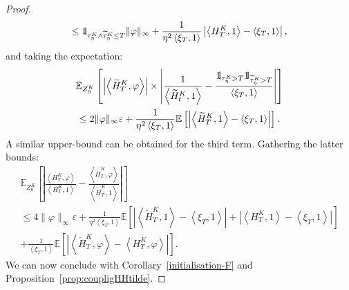 \documentclass[AHL,Unicode,longabstracts,published]{cedram}
\newcommand*\E{\mathbb{E}}
\newcommand*\ind{{\mathchoice {\rm 1\mskip-4mu l} {\rm 1\mskip-4mu l} {\rm 1\mskip-4.5mu l} {\rm 1\mskip-5mu l}}}
\begin{document}
\begin{proof}
\begin{multline*}
\leq \ind_{\tau^K_\eta \wedge \widetilde{\tau}^K_\eta \leq T}
\|\varphi\|_\infty + \frac{1}{\eta^2\left\langle \xi_T,1\right\rangle}\left|\left\langle H^K_T,1\right\rangle - \left\langle \xi_T,1\right\rangle\right|,
\end{multline*}
and taking the expectation:
\begin{multline*}
\E_{Z^K_0}\left[\left|\left\langle \widetilde{H}^K_T,\varphi\right\rangle \right| \times \left|\frac{1}{\left\langle \widetilde{H}^K_t,1\right\rangle}- \frac{\ind_{\tau^K_\eta > T}\ind_{\widetilde{\tau}^K_\eta > T}}{\left\langle \xi_T,1\right\rangle}\right|\right]\\
\leq 2 \|\varphi\|_\infty \varepsilon + \frac{1}{\eta^2 \left\langle \xi_T,1\right\rangle}\E\left[\left|\left\langle \widetilde{H}^K_T,1\right\rangle - \left\langle \xi_T,1\right\rangle\right|\right].
\end{multline*}
A similar upper-bound can be obtained for the third term. Gathering the latter bounds:
\begin{multline*}
\E_{Z^K_0}\left[\left| \frac{\left\langle H^K_T,\varphi\right\rangle}{\left\langle H^K_T,1\right\rangle}-\frac{\left\langle \widetilde{H}^K_T,\varphi\right\rangle}{\left\langle \widetilde{H}^K_T,1\right\rangle}\right| \right]\\
\leq 4 \|\varphi\|_\infty \varepsilon + \frac{1}{\eta^2 \left\langle \xi_T,1\right\rangle}\E\left[\left|\left\langle \widetilde{H}^K_T,1\right\rangle - \left\langle \xi_T,1\right\rangle\right|+\left|\left\langle H^K_T,1\right\rangle - \left\langle \xi_T,1\right\rangle\right|\right]\\
+\frac{1}{\left\langle \xi_T,1\right\rangle}
\E\left[\left|\left\langle \widetilde{H}^K_T,\varphi\right\rangle - \left\langle H^K_T,\varphi\right\rangle\right|\right].
\end{multline*}
We can now conclude with Corollary~\ref{initialisation-F} and Proposition~\ref{prop:coupligHHtilde}.
\end{proof}
\end{document}
